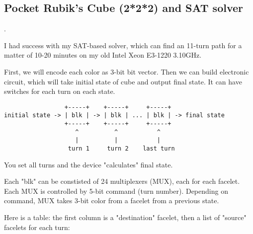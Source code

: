 \subsection{Pocket Rubik's Cube (2*2*2) and SAT solver}
\label{PocketCubeSAT}.

\renewcommand{\CURPATH}{puzzles/rubik2/SAT}

I had success with my SAT-based solver, which can find an 11-turn path for a matter of 10-20 minutes on my old
Intel Xeon E3-1220 3.10GHz.

First, we will encode each color as 3-bit bit vector.
Then we can build electronic circuit, which will take initial state of cube and output final state.
It can have switches for each turn on each state.

\begin{lstlisting}
                 +-----+    +-----+     +-----+
initial state -> | blk | -> | blk | ... | blk | -> final state
                 +-----+    +-----+     +-----+
                    ^          ^           ^
                    |          |           |
                  turn 1     turn 2    last turn
\end{lstlisting}

You set all turns and the device "calculates" final state.

Each "blk" can be constisted of 24 multiplexers (MUX), each for each facelet.
Each MUX is controlled by 5-bit command (turn number).
Depending on command, MUX takes 3-bit color from a facelet from a previous state.

Here is a table: the first column is a "destination" facelet, then a list of "source" facelets for each turn:

